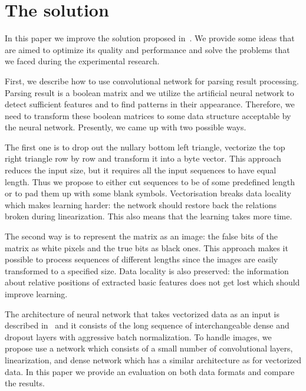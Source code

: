 \documentclass[runningheads]{llncs}
\begin{document}
\section{The solution}
In this paper we improve the solution proposed in~\cite{grigorevcomposition}. We provide some ideas that are aimed to optimize its quality and performance and solve the problems that we faced during the experimental research.

First, we describe how to use convolutional network for parsing result processing. Parsing result is a boolean matrix and we utilize the artificial neural network to detect sufficient features and to find patterns in their appearance.
Therefore, we need to transform these boolean matrices to some data structure acceptable by the neural network.
Presently, we came up with two possible ways.

The first one is to drop out the nullary bottom left triangle, vectorize the top right triangle row by row and transform it into a byte vector.
This approach reduces the input size, but it requires all the input sequences to have equal length.
Thus we propose to either cut sequences to be of some predefined length or to pad them up with some blank symbols.
Vectorisation breaks data locality which makes learning harder: the network should restore back the relations broken during linearization.
This also means that the learning takes more time.

The second way is to represent the matrix as an image: the false bits of the matrix as white pixels and the true bits as black ones.
This approach makes it possible to process sequences of different lengths since the images are easily transformed to a specified size.
Data locality is also preserved: the information about relative positions of extracted basic features does not get lost which should improve learning.

The architecture of neural network that takes vectorized data as an input is described in~\cite{grigorevcomposition} and it consists of the long sequence of interchangeable dense and dropout layers with aggressive batch normalization. To handle images, we propose use a network which consists of a small number of convolutional layers, linearization, and dense network which has a similar architecture as for vectorized data.
In this paper we provide an evaluation on both data formats and compare the results.
\end{document}
